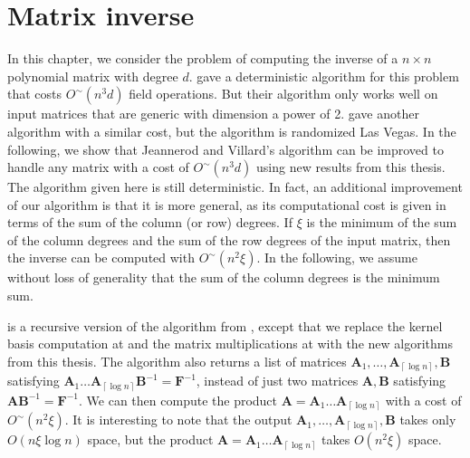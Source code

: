 
\chapter{\label{chap:Matrix-inverse}Matrix inverse}

In this chapter, we consider the problem of computing the inverse
of a $n\times n$ polynomial matrix with degree $d$. \citet{jeannerod-villard:05}
gave a deterministic algorithm for this problem that costs $O^{\sim}\left(n^{3}d\right)$
field operations. But their algorithm only works well on input matrices
that are generic with dimension a power of 2. \citet{storjohann:2008}
gave another algorithm with a similar cost, but the algorithm is randomized
Las Vegas. In the following, we show that Jeannerod and Villard's
algorithm can be improved to handle any matrix with a cost of $O^{\sim}\left(n^{3}d\right)$
using new results from this thesis. The algorithm given here is still
deterministic. In fact, an additional improvement of our algorithm
is that it is more general, as its computational cost is given in
terms of the sum of the column (or row) degrees. If $\xi$ is the
minimum of the sum of the column degrees and the sum of the row degrees
of the input matrix, then the inverse can be computed with $O^{\sim}\left(n^{2}\xi\right).$
In the following, we assume without loss of generality that the sum
of the column degrees is the minimum sum.



 is a recursive version of the algorithm
from \citet{jeannerod-villard:05}, except that we replace the kernel
basis computation at  and
the matrix multiplications at  with the
new algorithms from this thesis. The algorithm also returns a list
of matrices $\mathbf{A}_{1},\dots,\mathbf{A}_{\left\lceil \log n\right\rceil },\mathbf{B}$
satisfying $\mathbf{A}_{1}\dots\mathbf{A}_{\left\lceil \log n\right\rceil }\mathbf{B}^{-1}=\mathbf{F}^{-1}$,
instead of just two matrices $\mathbf{A},\mathbf{B}$ satisfying $\mathbf{A}\mathbf{B}^{-1}=\mathbf{F}^{-1}$.
We can then compute the product $\mathbf{A}=\mathbf{A}_{1}\dots\mathbf{A}_{\left\lceil \log n\right\rceil }$
with a cost of $O^{\sim}\left(n^{2}\xi\right)$. It is interesting
to note that the output $\mathbf{A}_{1},\dots,\mathbf{A}_{\left\lceil \log n\right\rceil },\mathbf{B}$
takes only $O(n\xi\log n)$ space, but the product $\mathbf{A}=\mathbf{A}_{1}\dots\mathbf{A}_{\left\lceil \log n\right\rceil }$
takes $O(n^{2}\xi)$ space.

